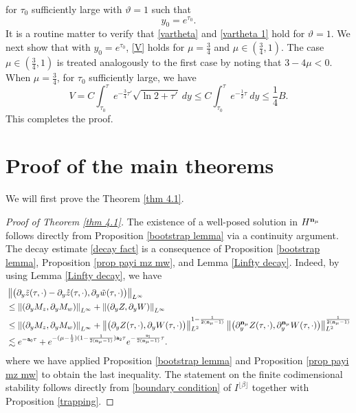 \documentclass{article}
\newcommand{\norm}[1]{\left\lVert#1\right\rVert}
\newcommand{\pa}{\partial}
\def\be{\begin{equation}}
\def\ee{\end{equation}}
\def\espz{Z}
\def\espw{W}
\def\mz{M_z}
\def\mw{M_w}
\def\epone{\mathtt{a_1}}
\def\eptwo{\mathtt{a_2}}
\def\epzero{\mathtt{a_0}}
\def\ndmu{{\bf{n}_{\mu}}}
\numberwithin{equation}{section}
\begin{document}
 for $\tau_0$ sufficiently large with 
$\vartheta=1$ such that 
 \be\label{y_0}
 y_0=e^{\tau_0}.
 \ee
 It is a routine matter to verify that \eqref{vartheta} and \eqref{vartheta 1} hold for $\vartheta=1$. We next show that with $y_0=e^{\tau_0}$, \eqref{V} holds for $\mu=\frac34$ and $\mu\in(\frac34,1)$. The case $\mu\in(\frac34,1)$ is treated analogously to the first case by noting that $3-4\mu<0$.  When $\mu=\frac34$, for $\tau_0$ sufficiently large, we have
 \be
        V = C\int_{\tau_0}^\tau e^{-\frac34\tau'}\sqrt{\ln 2+\tau'}\ dy \leq   C\int_{\tau_0}^\tau e^{-\frac12\tau}\ dy \leq \frac14 B.
 \ee
This completes the proof.
 
\section{Proof of the main theorems}  

We will first prove the Theorem \ref{thm 4.1}.
\begin{proof}[Proof of Theorem \ref{thm 4.1}]
The existence of a well-posed solution in $H^\ndmu$ follows directly from Proposition \ref{bootstrap lemma} via a continuity argument. The decay estimate \eqref{decay fact} is a consequence of Proposition \ref{bootstrap lemma}, Proposition \ref{prop payi mz mw}, and Lemma %
\ref{Linfty decay}. Indeed, by using Lemma %
\ref{Linfty decay}, we have
\begin{align*}
    &\norm{\big(\pa_y\tilde z(\tau,\cdot)-\pa_y \mathring z(\tau,\cdot), \pa_y\tilde w(\tau,\cdot)\big)}_{L^\infty} \\&\leq \norm{(\pa_y\mz,\pa_y\mw)}_{L^\infty} + \norm{(\pa_y\espz,\pa_y\espw)}_{L^\infty} \\
    &\leq \norm{(\pa_y\mz,\pa_y\mw)}_{L^\infty} + \norm{\big(\pa_y\espz(\tau,\cdot), \pa_y\espw(\tau,\cdot)\big)}_{L^2}^{1-\frac{1}{2(\ndmu-1)}}\norm{\big(\pa_y^\ndmu\espz(\tau,\cdot), \pa_y^\ndmu\espw(\tau,\cdot)\big)}_{L^2}^{\frac{1}{2(\ndmu-1)}}\\
    & \lesssim e^{-\epzero\tau} + e^{-(\mu-\frac12)(1-\frac{1}{2(\ndmu-1)})\eptwo\tau}e^{-\frac{\epone}{2(\ndmu-1)}\tau}.
\end{align*}
where we have applied Proposition \ref{bootstrap lemma} and Proposition \ref{prop payi mz mw} to obtain the last inequality.
The statement on the finite codimensional stability follows directly from \eqref{boundary condition} of $I^{\lfloor \beta \rfloor}$ together with Proposition \ref{trapping}.
\end{proof}
\end{document}

